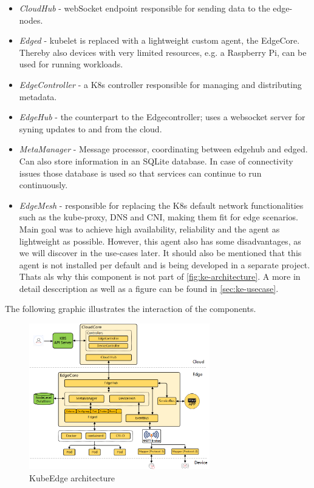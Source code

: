 \documentclass[MSC,Master,english]{twbook}%
\begin{document}
\begin{itemize}
    \item \textit{CloudHub} - webSocket endpoint responsible for sending data to the edge-nodes.
    \item \textit{Edged} - kubelet is replaced with a lightweight custom agent, the EdgeCore. Thereby also devices with very limited resources, e.g. a Raspberry Pi, can be used for running workloads.
    \item \textit{EdgeController} - a \ac{K8s} controller responsible for managing and distributing metadata.
    \item \textit{EdgeHub} - the counterpart to the Edgecontroller; uses a websocket server for syning updates to and from the cloud.
    \item \textit{MetaManager} - Message processor, coordinating between edgehub and edged. Can also store information in an SQLite database. In case of connectivity issues those database is used so that services can continue to run continuously.
    \item \textit{EdgeMesh} - responsible for replacing the \ac{K8s} default network functionalities such as the kube-proxy, \ac{DNS} and \ac{CNI}, making them fit for edge scenarios. Main goal was to achieve high availability, reliability and the agent as lightweight as possible. However, this agent also has some disadvantages, as we will discover in the use-cases later. It should also be mentioned that this agent is not installed per default and is being developed in a separate project. Thats als why this component is not part of \autoref{fig:ke-architecture}. A more in detail desccription as well as a figure can be found in \autoref{sec:ke-usecase}.
\end{itemize}

The following graphic illustrates the interaction of the components. 
\begin{figure}[ht]
    \centering
    \includegraphics[width=0.70\textwidth]{PICs/kubeedge-arch.png}
    \caption{KubeEdge architecture\cite{ke-docs-why}}
    \label{fig:ke-architecture}
\end{figure}
\end{document}
